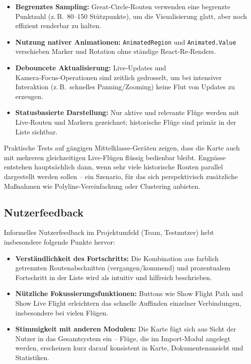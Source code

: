 \begin{itemize}
  \item \textbf{Begrenztes Sampling:} Great‑Circle‑Routen verwenden eine begrenzte Punktzahl (z.\,B.\ 80–150 Stützpunkte), um die Visualisierung glatt, aber noch effizient renderbar zu halten.
  \item \textbf{Nutzung nativer Animationen:} \texttt{AnimatedRegion} und \texttt{Animated.Value} verschieben Marker und Rotation ohne ständige React‑Re‑Renders.
  \item \textbf{Debouncete Aktualisierung:} Live‑Updates und Kamera‑Focus‑Operationen sind zeitlich gedrosselt, um bei intensiver Interaktion (z.\,B.\ schnelles Panning/Zooming) keine Flut von Updates zu erzeugen.
  \item \textbf{Statusbasierte Darstellung:} Nur aktive und relevante Flüge werden mit Live‑Routen und Markern gezeichnet; historische Flüge sind primär in der Liste sichtbar.
\end{itemize}

Praktische Tests auf gängigen Mittelklasse‑Geräten zeigen, dass die Karte auch mit mehreren gleichzeitigen Live‑Flügen flüssig bedienbar bleibt.
Engpässe entstehen hauptsächlich dann, wenn sehr viele historische Routen parallel dargestellt werden sollen – ein Szenario, für das sich perspektivisch zusätzliche Maßnahmen wie Polyline‑Vereinfachung oder Clustering anbieten.

\subsection{Nutzerfeedback}

Informelles Nutzerfeedback im Projektumfeld (Team, Testnutzer) hebt insbesondere folgende Punkte hervor:

\begin{itemize}
  \item \textbf{Verständlichkeit des Fortschritts:} Die Kombination aus farblich getrennten Routenabschnitten (vergangen/kommend) und prozentualem Fortschritt in der Liste wird als intuitiv und hilfreich beschrieben.
  \item \textbf{Nützliche Fokussierungsfunktionen:} Buttons wie \glqq Show Flight Path\grqq{} und \glqq Show Live Flight\grqq{} erleichtern das schnelle Auffinden einzelner Verbindungen, insbesondere bei vielen Flügen.
  \item \textbf{Stimmigkeit mit anderen Modulen:} Die Karte fügt sich aus Sicht der Nutzer in das Gesamtsystem ein – Flüge, die im Import-Modul angelegt werden, erscheinen kurz darauf konsistent in Karte, Dokumentenansicht und Statistiken.
\end{itemize}

